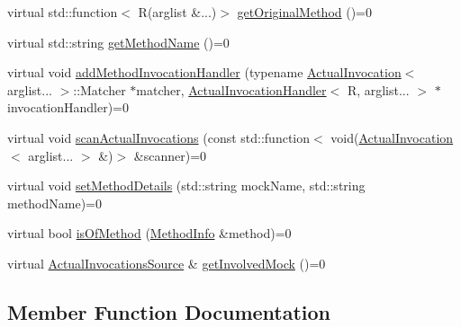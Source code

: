 \begin{DoxyCompactItemize}
\item 
virtual std\+::function$<$ R(arglist \&...)$>$ \mbox{\hyperlink{structfakeit_1_1MethodMockingContext_1_1Context_a1878bb27937f4984d5c43e20c2b0b626}{get\+Original\+Method}} ()=0
\item 
virtual std\+::string \mbox{\hyperlink{structfakeit_1_1MethodMockingContext_1_1Context_ab5f7cc2c8d00214baacaad4c49ccf17f}{get\+Method\+Name}} ()=0
\item 
virtual void \mbox{\hyperlink{structfakeit_1_1MethodMockingContext_1_1Context_a87b3a2d95daf8aaa2ae56b49e032c275}{add\+Method\+Invocation\+Handler}} (typename \mbox{\hyperlink{structfakeit_1_1ActualInvocation}{Actual\+Invocation}}$<$ arglist... $>$\+::Matcher $\ast$matcher, \mbox{\hyperlink{structfakeit_1_1ActualInvocationHandler}{Actual\+Invocation\+Handler}}$<$ R, arglist... $>$ $\ast$invocation\+Handler)=0
\item 
virtual void \mbox{\hyperlink{structfakeit_1_1MethodMockingContext_1_1Context_a89b30ea54bcf5e55c19696f77ad8423b}{scan\+Actual\+Invocations}} (const std\+::function$<$ void(\mbox{\hyperlink{structfakeit_1_1ActualInvocation}{Actual\+Invocation}}$<$ arglist... $>$ \&)$>$ \&scanner)=0
\item 
virtual void \mbox{\hyperlink{structfakeit_1_1MethodMockingContext_1_1Context_a9eb0cf6ed84ea4bd63333503bd6bdc1a}{set\+Method\+Details}} (std\+::string mock\+Name, std\+::string method\+Name)=0
\item 
virtual bool \mbox{\hyperlink{structfakeit_1_1MethodMockingContext_1_1Context_a126835068d4a7bcbf01f47080e690510}{is\+Of\+Method}} (\mbox{\hyperlink{structfakeit_1_1MethodInfo}{Method\+Info}} \&method)=0
\item 
virtual \mbox{\hyperlink{structfakeit_1_1ActualInvocationsSource}{Actual\+Invocations\+Source}} \& \mbox{\hyperlink{structfakeit_1_1MethodMockingContext_1_1Context_aab7f9487475b01f85e81b76cdf6c4860}{get\+Involved\+Mock}} ()=0
\end{DoxyCompactItemize}


\subsection{Member Function Documentation}
\mbox{\label{structfakeit_1_1MethodMockingContext_1_1Context_a87b3a2d95daf8aaa2ae56b49e032c275}} 
